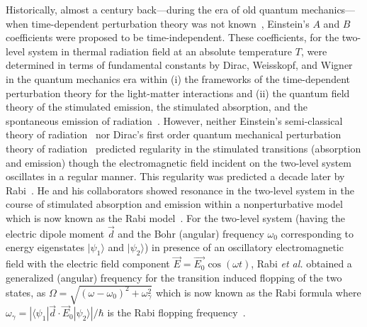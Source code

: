 \documentclass[aps,pra,twocolumn,showpacs,preprintnumbers,amsmath,amssymb,footinbib]{revtex4}
\begin{document}
Historically, almost a century back---during the era of old quantum mechanics---when time-dependent perturbation theory was not known~\cite{Einstein}, Einstein's $A$ and $B$ coefficients were proposed to be time-independent. These coefficients, for the two-level system in thermal radiation field at an absolute temperature $T$, were determined in terms of fundamental constants by Dirac, Weisskopf, and Wigner in the quantum mechanics era within (i) the frameworks of the time-dependent perturbation theory for the light-matter interactions and (ii) the quantum field theory of the stimulated emission, the stimulated absorption, and the spontaneous emission of radiation~\cite{Dirac,Weisskopf}. However, neither Einstein's semi-classical theory of radiation~\cite{Einstein} nor Dirac's first order quantum mechanical perturbation theory of radiation~\cite{Dirac} predicted regularity in the stimulated transitions (absorption and emission) though the electromagnetic field incident on the two-level system oscillates in a regular manner. This regularity was predicted a decade later by Rabi~\cite{Rabi}. He and his collaborators showed resonance in the two-level system in the course of stimulated absorption and emission within a nonperturbative model which is now known as the Rabi model~\cite{Rabi,Rabi2}. For the two-level system (having the electric dipole moment $\vec{d}$ and the Bohr (angular) frequency $\omega_0$ corresponding to energy eigenstates $|{\psi_1}\rangle$ and $|\psi_2\rangle$) in presence of an oscillatory electromagnetic field with the electric field component $\vec{E}=\vec{E_0}\cos(\omega t)$, Rabi \textit{et al.} obtained a generalized (angular) frequency for the transition induced flopping of the two states, as $\Omega=\sqrt{(\omega-\omega_0)^2+\omega_\gamma^2}$ which is now known as the Rabi formula where $\omega_\gamma=|\langle\psi_1|\vec{d}\cdot \vec{E}_0|\psi_2\rangle|/\hbar$ is the Rabi flopping frequency~\cite{Rabi2}. 
\end{document}
